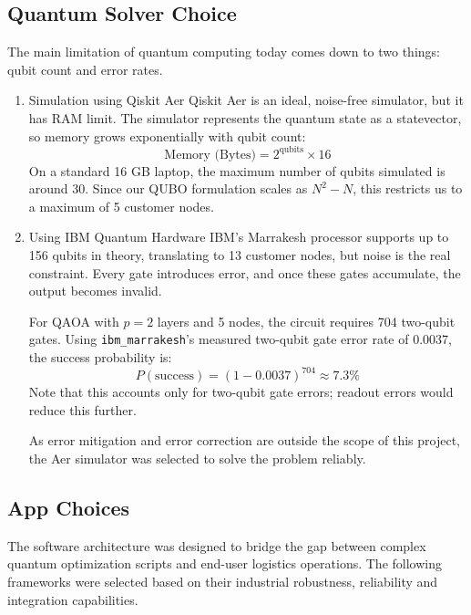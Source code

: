 \documentclass[a4paper]{report}
\begin{document}
{\begin{itemize}
\begin{enumerate}
\end{enumerate}


\subsection{Quantum Solver Choice}
The main limitation of quantum computing today comes down to two things: qubit count and error rates.
\begin{enumerate}
    \item {Simulation using Qiskit Aer}
Qiskit Aer is an ideal, noise-free simulator, but it has RAM limit. The simulator represents the quantum state as a statevector, so memory grows exponentially with qubit count:
\begin{equation}
    \text{Memory (Bytes)} = 2^{\text{qubits}} \times 16
\end{equation}
On a standard 16 GB laptop, the maximum number of qubits simulated is around 30. Since our QUBO formulation scales as $N^2 - N$, this restricts us to a maximum of 5 customer nodes.

\item{Using IBM Quantum Hardware}
IBM's Marrakesh processor supports up to 156 qubits in theory, translating to 13 customer nodes, but noise is the real constraint. Every gate introduces error, and once these gates accumulate, the output becomes invalid.

For QAOA with $p = 2$ layers and 5 nodes, the circuit requires 704 two-qubit gates. Using \texttt{ibm\_marrakesh}'s measured two-qubit gate error rate of 0.0037, the success probability is:
\begin{equation}
    P(\text{success}) = (1 - 0.0037)^{704} \approx 7.3\%
\end{equation}
Note that this accounts only for two-qubit gate errors; readout errors would reduce this further.

As error mitigation and error correction are outside the scope of this project, the Aer simulator was selected to solve the problem reliably.
\end{enumerate}
\subsection{App Choices}
The software architecture was designed to bridge the gap between complex quantum optimization scripts and end-user logistics operations. The following frameworks were selected based on their industrial robustness, reliability and integration capabilities.

\end{itemize}}
\end{document}
